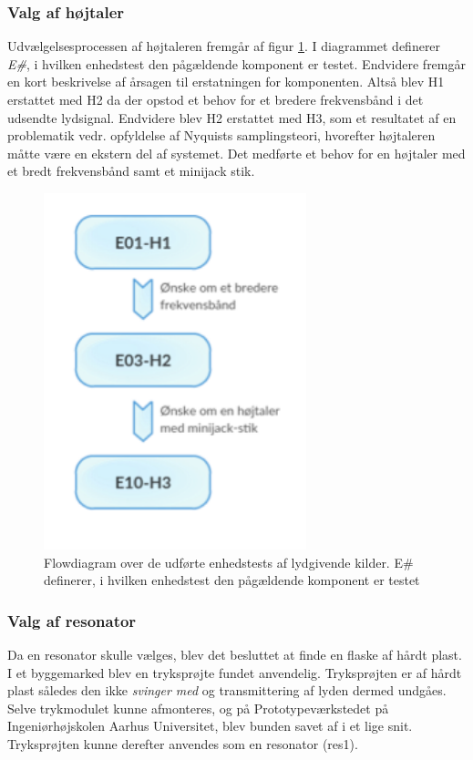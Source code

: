 \subsubsection{Valg af højtaler}
Udvælgelsesprocessen af højtaleren fremgår af figur \ref{fig:flowlyd}. I diagrammet definerer \textit{E\#}, i hvilken enhedstest den pågældende komponent er testet. Endvidere fremgår en kort beskrivelse af årsagen til erstatningen for komponenten. Altså blev H1 erstattet med H2 da der opstod et behov for et bredere frekvensbånd i det udsendte lydsignal. Endvidere blev H2 erstattet med H3, som et resultatet af en problematik vedr. opfyldelse af Nyquists samplingsteori, hvorefter højtaleren måtte være en ekstern del af systemet. Det medførte et behov for en højtaler med et bredt frekvensbånd samt et minijack stik. 

\begin{figure}[htb]
\centering
\includegraphics[width=3in]{flowdiagramelyd.png}
\caption{Flowdiagram over de udførte enhedstests af lydgivende kilder. E\# definerer, i hvilken enhedstest den pågældende komponent er testet}
\label{fig:flowlyd}
\end{figure}

\subsubsection{Valg af resonator}
Da en resonator skulle vælges, blev det besluttet at finde en flaske af hårdt plast. I et byggemarked blev en tryksprøjte fundet anvendelig. Tryksprøjten er af hårdt plast således den ikke \textit{svinger med} og transmittering af lyden dermed undgåes. Selve trykmodulet kunne afmonteres, og på Prototypeværkstedet på Ingeniørhøjskolen Aarhus Universitet, blev bunden savet af i et lige snit. Tryksprøjten kunne derefter anvendes som en resonator (res1).   

